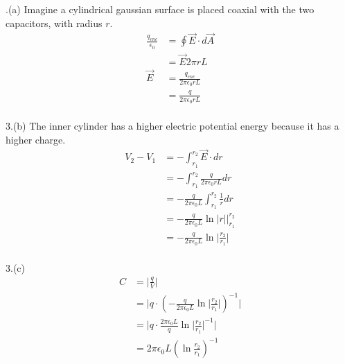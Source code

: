 \documentclass[11pt]{article}
\begin{document}
.(a)
Imagine a cylindrical gaussian surface is placed coaxial with the two capacitors, with radius \(r\).
\begin{align*}
\frac{q_{enc}}{\epsilon_0} &= \oint \overrightarrow{E} \cdot d \overrightarrow{A} \\ 
                   &= \overrightarrow{E} 2 \pi r L \\
\overrightarrow{E} &= \frac{q_{enc}}{2 \pi \epsilon_0 r L} \\
                   &= \frac{q}{2 \pi \epsilon_0 r L} \\
\end{align*}

3.(b)
The inner cylinder has a higher electric potential energy because it has a higher charge.
\begin{align*}
V_2 - V_1 &= - \int^{r_2}_{r_1} \overrightarrow{E} \cdot dr \\
          &= - \int^{r_2}_{r_1} \frac{q}{2 \pi \epsilon_0 rL} dr \\
          &= - \frac{q}{2 \pi \epsilon_0 L} \int^{r_2}_{r_1} \frac{1}{r} dr \\
          &= - \frac{q}{2 \pi \epsilon_0 L} \ln{|r|} \bigg|^{r_2}_{r_1} \\
          &= - \frac{q}{2 \pi \epsilon_0 L} \ln{ \bigg| \frac{r_2}{r_1} \bigg| } \\
\end{align*}

3.(c)
\begin{align*}
C &= \bigg| \frac{q}{V} \bigg| \\
  &= \bigg| q \cdot (- \frac{q}{2 \pi \epsilon_0 L} \ln{\big| \frac{r_2}{r_1} \big|} )^{-1} \bigg| \\
  &= \bigg| q \cdot \frac{2 \pi \epsilon_0 L}{q} \ln{\big| \frac{r_2}{r_1} \big|}^{-1} \bigg| \\
  &= 2 \pi \epsilon_0 L (\ln{ \frac{r_2}{r_1}})^{-1}
\end{align*}
\end{document}
